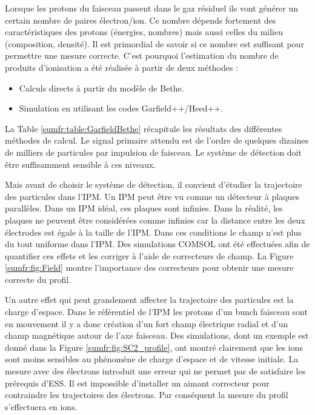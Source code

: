 Lorsque les protons du faisceau passent dans le gaz résiduel ils vont générer un certain nombre de paires électron/ion. Ce nombre dépends fortement des caractéristiques des protons (énergies, nombres) mais aussi celles du milieu (composition, densité). Il est primordial de savoir si ce nombre est suffisant pour permettre une mesure correcte. C'est pourquoi l'estimation du nombre de produits d'ionisation a été réalisée à partir de deux méthodes :
\begin{itemize}
  \item Calculs directs à partir du modèle de Bethe.
  \item Simulation en utilisant les codes Garfield++/Heed++.
\end{itemize}
La Table \ref{sumfr:table:GarfieldBethe} récapitule les résultats des différentes méthodes de calcul. Le signal primaire attendu est de l'ordre de quelques dizaines de milliers de particules par impulsion de faisceau. Le système de détection doit être suffisamment sensible à ces niveaux.


Mais avant de choisir le système de détection, il convient d'étudier la trajectoire des particules dans l'IPM.
Un IPM peut être vu comme un détecteur à plaques parallèles. Dans un IPM idéal, ces plaques sont infinies. Dans la réalité, les plaques ne peuvent être considérées comme infinies car la distance entre les deux électrodes est égale à la taille de l'IPM. Dans ces conditions le champ n’est plus du tout uniforme dans l'IPM. Des simulations COMSOL ont été effectuées afin de quantifier ces effets et les corriger à l'aide de correcteurs de champ. La Figure \ref{sumfr:fig:Field} montre l'importance des correcteurs pour obtenir une mesure correcte du profil.



Un autre effet qui peut grandement affecter la trajectoire des particules est la charge d'espace. Dans le référentiel de l'IPM les protons d'un bunch faisceau sont en mouvement il y a donc création d’un fort champ électrique radial et d'un champ magnétique autour de l'axe faisceau. Des simulations, dont un exemple est donné dans la Figure \ref{sumfr:fig:SC2_profile}, ont montré clairement que les ions sont moins sensibles au phénomène de charge d’espace et de vitesse initiale. 
La mesure avec des électrons introduit une erreur qui ne permet pas de satisfaire les prérequis d’ESS. Il est impossible d’installer un aimant correcteur pour contraindre les trajectoires des électrons. Par conséquent la mesure du profil s’effectuera en ions.

